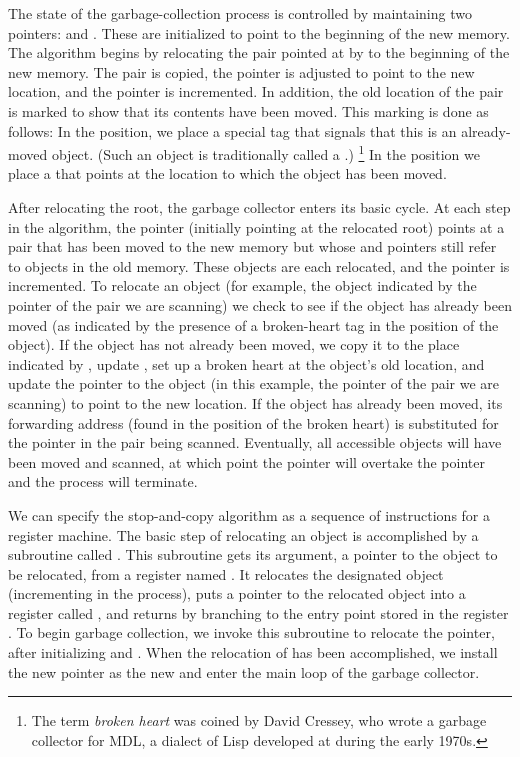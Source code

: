 The state of the garbage-collection process is controlled by maintaining two pointers:
 and .
These are initialized to point to the beginning of the new memory.
The algorithm begins by relocating the pair pointed at by  to the beginning of the new memory.
The pair is copied, the  pointer is adjusted to point to the new location, and the  pointer is incremented.
In addition, the old location of the pair is marked to show that its contents have been moved.
This marking is done as follows:
In the  position, we place a special tag that signals that this is an already-moved object.
(Such an object is traditionally called a .)%
\footnote{
	The term \emph{broken heart} was coined by David Cressey, who wrote a garbage collector for MDL, a dialect of Lisp developed at  during the early 1970s.
}
In the  position we place a  that points at the location to which the object has been moved.

After relocating the root, the garbage collector enters its basic cycle.
At each step in the algorithm, the  pointer (initially pointing at the relocated root) points at a pair that has been moved to the new memory but whose  and  pointers still refer to objects in the old memory.
These objects are each relocated, and the  pointer is incremented.
To relocate an object (for example, the object indicated by the  pointer of the pair we are scanning) we check to see if the object has already been moved (as indicated by the presence of a broken-heart tag in the  position of the object).
If the object has not already been moved, we copy it to the place indicated by , update , set up a broken heart at the object’s old location, and update the pointer to the object (in this example, the  pointer of the pair we are scanning) to point to the new location.
If the object has already been moved, its forwarding address (found in the  position of the broken heart) is substituted for the pointer in the pair being scanned.
Eventually, all accessible objects will have been moved and scanned, at which point the  pointer will overtake the  pointer and the process will terminate.

We can specify the stop-and-copy algorithm as a sequence of instructions for a register machine.
The basic step of relocating an object is accomplished by a subroutine called .
This subroutine gets its argument, a pointer to the object to be relocated, from a register named .
It relocates the designated object (incrementing  in the process), puts a pointer to the relocated object into a register called , and returns by branching to the entry point stored in the register .
To begin garbage collection, we invoke this subroutine to relocate the  pointer, after initializing  and .
When the relocation of  has been accomplished, we install the new pointer as the new  and enter the main loop of the garbage collector.

